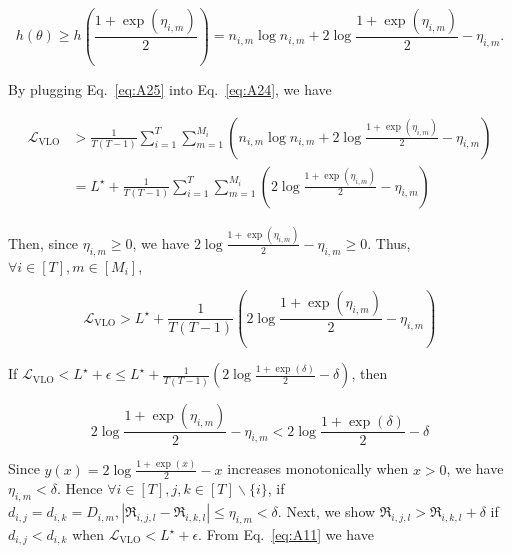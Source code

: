 \begin{equation}\label{eq:A25}
    h(\theta) \geq h\left(\frac{1+\exp \left(\eta_{i, m}\right)}{2}\right)=n_{i, m} \log n_{i, m}+2 \log \frac{1+\exp \left(\eta_{i, m}\right)}{2}-\eta_{i, m} .
\end{equation}

By plugging Eq.~\eqref{eq:A25} into Eq.~\eqref{eq:A24}, we have

\begin{equation}\label{eq:A26}
\begin{aligned}
\mathcal{L}_{\mathrm{VLO}} & >\frac{1}{T(T-1)} \sum_{i=1}^{T} \sum_{m=1}^{M_i}\left(n_{i, m} \log n_{i, m}+2 \log \frac{1+\exp \left(\eta_{i, m}\right)}{2}-\eta_{i, m}\right) \\
& =L^{\star}+\frac{1}{T(T-1)} \sum_{i=1}^{T} \sum_{m=1}^{M_i}\left(2 \log \frac{1+\exp \left(\eta_{i, m}\right)}{2}-\eta_{i, m}\right)
\end{aligned}
\end{equation}


Then, since $\eta_{i, m} \geq 0$, we have $2 \log \frac{1+\exp \left(\eta_{i, m}\right)}{2}-\eta_{i, m} \geq 0$. Thus, $\forall i \in[T], m \in\left[M_i\right]$,

\begin{equation}\label{eq:A27}
    \mathcal{L}_{\mathrm{VLO}}>L^{\star}+\frac{1}{T(T-1)}\left(2 \log \frac{1+\exp \left(\eta_{i, m}\right)}{2}-\eta_{i, m}\right)
\end{equation}


If $\mathcal{L}_{\mathrm{VLO}}<L^{\star}+\epsilon \leq L^{\star}+\frac{1}{T(T-1)}\left(2 \log \frac{1+\exp (\delta)}{2}-\delta\right)$, then

\begin{equation}\label{eq:A28}
    2 \log \frac{1+\exp \left(\eta_{i, m}\right)}{2}-\eta_{i, m}<2 \log \frac{1+\exp (\delta)}{2}-\delta
\end{equation}


Since $y(x)=2 \log \frac{1+\exp (x)}{2}-x$ increases monotonically when $x>0$, we have $\eta_{i, m}<\delta$. Hence $\forall i \in[T], j, k \in[T] \backslash\{i\}$, if $d_{i, j}=d_{i, k}=D_{i, m},\left|\mathfrak{R}_{i, j,l}-\mathfrak{R}_{i, k,l}\right| \leq \eta_{i, m}<\delta$.
Next, we show $\mathfrak{R}_{i, j,l}>\mathfrak{R}_{i, k,l}+\delta$ if $d_{i, j}<d_{i, k}$ when $\mathcal{L}_\mathrm{VLO}<L^{\star}+\epsilon$.
From Eq.~\eqref{eq:A11} we have

